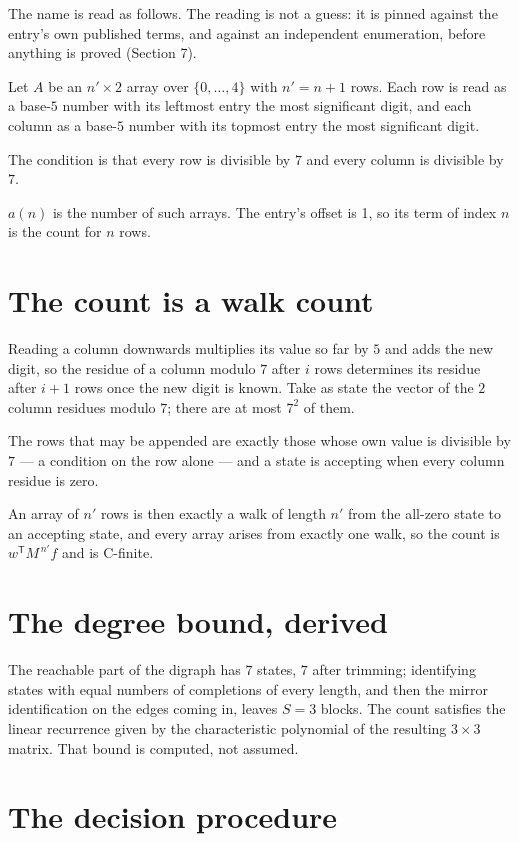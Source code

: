 \documentclass[11pt]{article}
\theoremstyle{definition}
\begin{document}
The name is read as follows. The reading is not a guess: it is pinned against the entry's own published terms, and against an independent enumeration, before anything is proved (Section 7).

Let $A$ be an $n' \times 2$ array over $\{0,\dots,4\}$ with $n' = n + 1$ rows. Each row is read as a base-$5$ number with its leftmost entry the most significant digit, and each column as a base-$5$ number with its topmost entry the most significant digit.

The condition is that every row is divisible by $7$ and every column is divisible by $7$.

$a(n)$ is the number of such arrays. The entry's offset is 1, so its term of index $n$ is the count for $n$ rows.

\section{The count is a walk count}

Reading a column downwards multiplies its value so far by $5$ and adds the new digit, so the residue of a column modulo $7$ after $i$ rows determines its residue after $i+1$ rows once the new digit is known. Take as state the vector of the $2$ column residues modulo $7$; there are at most $7^{2}$ of them.

The rows that may be appended are exactly those whose own value is divisible by $7$ --- a condition on the row alone --- and a state is accepting when every column residue is zero.

An array of $n'$ rows is then exactly a walk of length $n'$ from the all-zero state to an accepting state, and every array arises from exactly one walk, so the count is $w^{\mathsf T}M^{\,n'}f$ and is C-finite.

\section{The degree bound, derived}

The reachable part of the digraph has $7$ states, $7$ after trimming; identifying states with equal numbers of completions of every length, and then the mirror identification on the edges coming in, leaves $S = 3$ blocks. The count satisfies the linear recurrence given by the characteristic polynomial of the resulting $3\times3$ matrix. That bound is computed, not assumed.

\section{The decision procedure}
\end{document}
